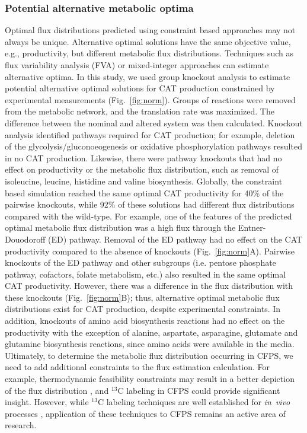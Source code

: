 \documentclass[journal=asbcd6,manuscript=article]{achemso}
\begin{document}
\subsubsection{Potential alternative metabolic optima}
Optimal flux distributions predicted using constraint based approaches may not always be unique.
Alternative optimal solutions have the same objective value, e.g., productivity, but different metabolic flux distributions.
Techniques such as flux variability analysis (FVA) \cite{Mahadevan2003264,Schuetz:2007aa} or mixed-integer approaches \cite{LEE2000711} can estimate alternative optima.
In this study, we used group knockout analysis to estimate potential alternative optimal solutions for CAT production constrained by experimental measurements (Fig.~\ref{fig:norm}).
Groups of reactions were removed from the metabolic network, and the translation rate was maximized.
The difference between the nominal and altered system was then calculated.
Knockout analysis identified pathways required for CAT production; for example, deletion of the glycolysis/gluconoeogenesis or oxidative phosphorylation pathways resulted in no CAT production.
Likewise, there were pathway knockouts that had no effect on productivity or the metabolic flux distribution, such as removal of isoleucine, leucine, histidine and valine biosynthesis.
Globally, the constraint based simulation reached the same optimal CAT productivity for 40\% of the pairwise knockouts, while 92\% of these solutions had different flux distributions compared with the wild-type.
For example, one of the features of the predicted optimal metabolic flux distribution was a high flux through the Entner-Douodoroff (ED) pathway.
Removal of the ED pathway had no effect on the CAT productivity compared to the absence of knockouts (Fig.~\ref{fig:norm}A).
Pairwise knockouts of the ED pathway and other subgroups (i.e. pentose phosphate pathway, cofactors, folate metabolism, etc.) also resulted in the same optimal CAT productivity.
However, there was a difference in the flux distribution with these knockouts (Fig.~\ref{fig:norm}B); thus, alternative optimal metabolic flux distributions exist for CAT production, despite experimental constraints.
In addition, knockouts of amino acid biosynthesis reactions had no effect on the productivity with the exception of alanine, aspartate, asparagine, glutamate and glutamine biosynthesis reactions, since amino acids were available in the media.
Ultimately, to determine the metabolic flux distribution occurring in CFPS, we need to add additional constraints to the flux estimation calculation.
For example, thermodynamic feasibility constraints may result in a better depiction of the flux distribution \cite{Henry:2007,Hamilton:2013}, and $^{13}$C labeling in CFPS could provide significant insight.
However, while $^{13}$C labeling techniques are well established for \emph{in~vivo} processes \cite{Zamboni:2009}, application of these techniques to CFPS remains an active area of research.
\end{document}
